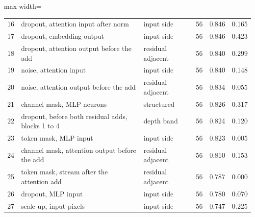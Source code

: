 \begin{table}[htbp]
\begin{adjustbox}{max width=\linewidth}
\begin{tabular}{rllrrr}
16 & dropout, attention input after norm & input side & 56 & 0.846 & 0.165 \\
17 & dropout, embedding output & input side & 56 & 0.846 & 0.423 \\
18 & dropout, attention output before the add & residual adjacent & 56 & 0.840 & 0.299 \\
19 & noise, attention input & input side & 56 & 0.840 & 0.148 \\
20 & noise, attention output before the add & residual adjacent & 56 & 0.834 & 0.055 \\
21 & channel mask, MLP neurons & structured & 56 & 0.826 & 0.317 \\
22 & dropout, before both residual adds, blocks 1 to 4 & depth band & 56 & 0.824 & 0.120 \\
23 & token mask, MLP input & input side & 56 & 0.823 & 0.005 \\
24 & channel mask, attention output before the add & residual adjacent & 56 & 0.810 & 0.153 \\
25 & token mask, stream after the attention add & residual adjacent & 56 & 0.787 & 0.000 \\
26 & dropout, MLP input & input side & 56 & 0.780 & 0.070 \\
27 & scale up, input pixels & input side & 56 & 0.747 & 0.225 \\
\bottomrule
\end{tabular}
\end{adjustbox}
\end{table}
